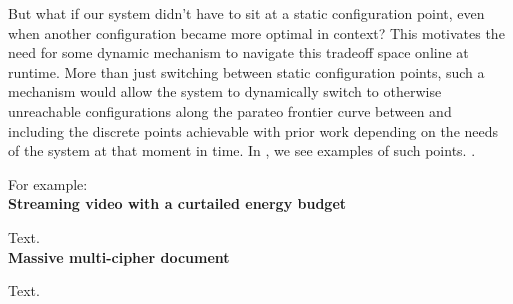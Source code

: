 But what if our system didn't have to sit at a static configuration point, even
when another configuration became more optimal in context? This motivates the
need for some dynamic mechanism to navigate this tradeoff space online at
runtime. More than just switching between static configuration points, such a
mechanism would allow the system to dynamically switch to otherwise unreachable
configurations along the parateo frontier curve between and including the
discrete points achievable with prior work depending on the needs of the system
at that moment in time. In , we see examples of
such points. .

For example:\\

\noindent
\textbf{Streaming video with a curtailed energy budget}

Text.\\

\noindent
\textbf{Massive multi-cipher document}

Text.
